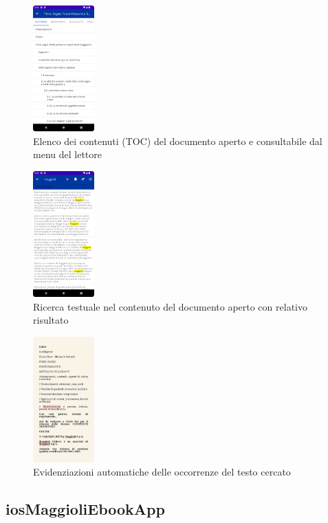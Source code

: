 \begin{multicols}{3}
            \begin{figure}[H]
                \includegraphics[width=0.21\textwidth]{img/toc.png}
                \caption{Elenco dei contenuti (TOC) del documento aperto e consultabile dal menu del lettore}
                \label{toc}
            \end{figure}
            
            \begin{figure}[H]
                \includegraphics[width=0.21\textwidth]{img/ricerca_testo.png}
                \caption{Ricerca testuale nel contenuto del documento aperto con relativo risultato}
                \label{ricerca_testo}
            \end{figure}
            
            \begin{figure}[H]
                \includegraphics[width=0.21\textwidth]{img/ricerca_testo2.png}
                \caption{Evidenziazioni automatiche delle occorrenze del testo cercato}
                \label{ricerca_testo2}
            \end{figure}
\end{multicols}

\subsection{iosMaggioliEbookApp}